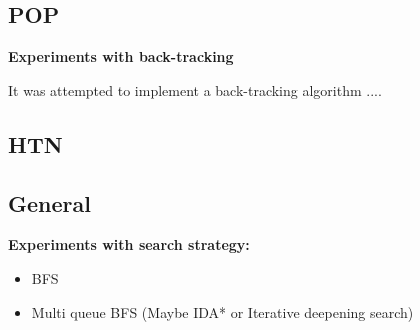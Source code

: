 \documentclass[Main]{subfiles}
\begin{document}
\subsection{POP}

\bf{Experiments with back-tracking}

It was attempted to implement a back-tracking algorithm ....



\subsection{HTN}


\subsection{General} 


\bf{Experiments with search strategy:}

\begin{itemize}
    \item BFS 
    \item Multi queue BFS (Maybe IDA* or Iterative deepening search)
\end{itemize}
\end{document}
